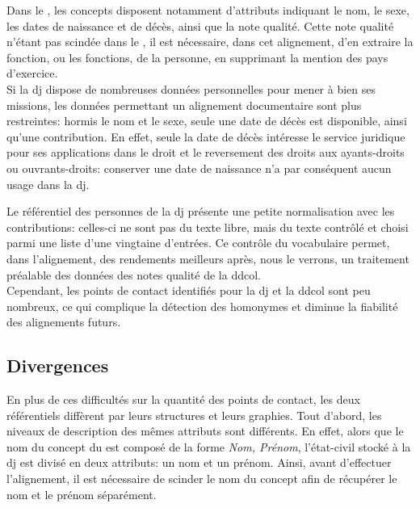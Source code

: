 Dans le \ldd, les concepts disposent notamment d'attributs indiquant le nom, le sexe, les dates de naissance et de décès, ainsi que la note qualité. Cette note qualité n'étant pas scindée dans le \ldd, il est nécessaire, dans cet alignement, d'en extraire la fonction, ou les fonctions, de la personne, en supprimant la mention des pays d'exercice.\\

Si la \ac{dj} dispose de nombreuses données personnelles pour mener à bien ses missions, les données permettant un alignement documentaire sont plus restreintes: hormis le nom et le sexe, seule une date de décès est disponible, ainsi qu'une contribution. En effet, seule la date de décès intéresse le service juridique pour ses applications dans le droit et le reversement des droits aux ayants-droits ou ouvrants-droits: conserver une date de naissance n'a par conséquent aucun usage dans la \ac{dj}.

\noindent Le référentiel des personnes de la \ac{dj} présente une petite normalisation avec les contributions: celles-ci ne sont pas du texte libre, mais du texte contrôlé et choisi parmi une liste d'une vingtaine d'entrées. Ce contrôle du vocabulaire permet, dans l'alignement, des rendements meilleurs après, nous le verrons, un traitement préalable des données des notes qualité de la \ac{ddcol}.\\

Cependant, les points de contact identifiés pour la \ac{dj} et la \ac{ddcol} sont peu nombreux, ce qui complique la détection des homonymes et diminue la fiabilité des alignements futurs.

\subsection{\label{III-C-1-c}Divergences}

En plus de ces difficultés sur la quantité des points de contact, les deux référentiels diffèrent par leurs structures et leurs graphies. Tout d'abord, les niveaux de description des mêmes attributs sont différents. En effet, alors que le nom du concept du \ldd est composé de la forme \og \textit{Nom, Prénom}\fg{}, l'état-civil stocké à la \ac{dj} est divisé en deux attributs: un nom et un prénom. Ainsi, avant d'effectuer l'alignement, il est nécessaire de scinder le nom du concept afin de récupérer le nom et le prénom séparément.


